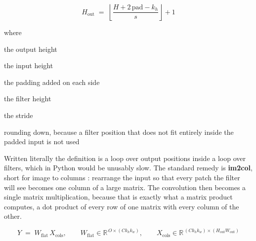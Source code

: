 \begin{equation}
H_{\mathrm{out}} \;=\; \left\lfloor \frac{H + 2\,\mathrm{pad} - k_h}{s} \right\rfloor + 1
\end{equation}

\noindent where
\begin{description}[leftmargin=2.4em,style=nextline,font=\normalfont\ttfamily]\setlength\itemsep{1pt}
  \item[{$H_{\mathrm{out}}$}] \normalfont the output height
  \item[{$H$}] \normalfont the input height
  \item[{$\mathrm{pad}$}] \normalfont the padding added on each side
  \item[{$k_h$}] \normalfont the filter height
  \item[{$s$}] \normalfont the stride
  \item[{$\lfloor \cdot \rfloor$}] \normalfont rounding down, because a filter position that does not fit entirely inside the padded input is not used
\end{description}

Written literally the definition is a loop over output positions inside a loop over filters, which in Python would be unusably slow. The standard remedy is \textbf{im2col}, short for image to columns \cite{chellapilla2006}: rearrange the input so that every patch the filter will see becomes one column of a large matrix. The convolution then becomes a single matrix multiplication, because that is exactly what a matrix product computes, a dot product of every row of one matrix with every column of the other.


\begin{equation}
Y \;=\; W_{\mathrm{flat}} \, X_{\mathrm{cols}}, \qquad W_{\mathrm{flat}} \in \mathbb{R}^{\,O \times (C k_h k_w)}, \qquad X_{\mathrm{cols}} \in \mathbb{R}^{\,(C k_h k_w) \times (H_{\mathrm{out}} W_{\mathrm{out}})}
\end{equation}

